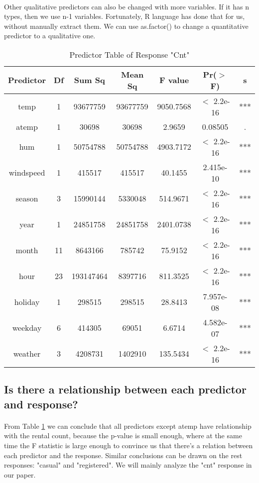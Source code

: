 \documentclass{article}[]
\begin{document}
\paragraph{}
Other qualitative predictors can also be changed with more variables. If it has n types, then we use n-1 variables. Fortunately, R language has done that for us, without manually extract them. We can use as.factor() to change a quantitative predictor to a qualitative one.

\begin{table}
\caption{Predictor Table of Response "Cnt"}
\centering
\begin{tabular}{c|c|c|c|c|c|c}
\hline
{\bf Predictor}&{\bf Df}&{\bf Sum Sq}&{\bf Mean Sq}&{\bf F value}&{\bf Pr($>$ F)}&{\bf s}\\
\hline
temp          &1  &93677759 &93677759 &9050.7568 &$<$ 2.2e-16 &***\\
atemp         &1     &30698    &30698    &2.9659   &0.08505 &.\\
hum           &1  &50754788 &50754788 &4903.7172 &$<$ 2.2e-16 &***\\
windspeed     &1    &415517   &415517   &40.1455 &2.415e-10 &***\\
season        &3  &15990144  &5330048  &514.9671 &$<$ 2.2e-16 &***\\
year          &1  &24851758 &24851758 &2401.0738 &$<$ 2.2e-16 &***\\
month        &11   &8643166   &785742   &75.9152 &$<$ 2.2e-16 &***\\
hour         &23 &193147464  &8397716  &811.3525 &$<$ 2.2e-16 &***\\
holiday       &1    &298515   &298515   &28.8413 &7.957e-08 &***\\
weekday       &6    &414305    &69051    &6.6714 &4.582e-07 &***\\
weather       &3   &4208731  &1402910  &135.5434 &$<$ 2.2e-16 &***\\
\hline
\end{tabular}
\label{table:predictor_table1}
\end{table}

\subsection{Is there a relationship between each predictor and response?}
\paragraph{}
From Table \ref{table:predictor_table1} we can conclude that all predictors except atemp have relationship with the rental count, because the p-value is small enough, where at the same time the F statistic is large enough to convince us that there's a relation between each predictor and the response. Similar conclusions can be drawn on the rest responses: "casual" and "registered". We will mainly analyze the "cnt" response in our paper.
\end{document}
